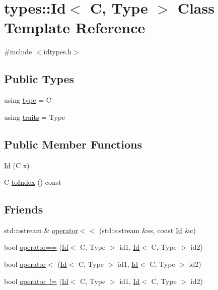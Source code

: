\hypertarget{classtypes_1_1_id}{}\section{types\+::Id$<$ C, Type $>$ Class Template Reference}
\label{classtypes_1_1_id}


{\ttfamily \#include $<$idtypes.\+h$>$}

\subsection*{Public Types}
\begin{DoxyCompactItemize}
\item 
using \mbox{\hyperlink{classtypes_1_1_id_a3460149759853c50fa31ad199e73419a}{type}} = C
\item 
using \mbox{\hyperlink{classtypes_1_1_id_a8682580e9156701f2366091360d85b92}{traits}} = Type
\end{DoxyCompactItemize}
\subsection*{Public Member Functions}
\begin{DoxyCompactItemize}
\item 
\mbox{\hyperlink{classtypes_1_1_id_acd8d5b53062c84735cd77f1b410857d1}{Id}} (C x)
\item 
C \mbox{\hyperlink{classtypes_1_1_id_a8b4a4ba53dfbfda655ece5e6ea9fbcd5}{to\+Index}} () const
\end{DoxyCompactItemize}
\subsection*{Friends}
\begin{DoxyCompactItemize}
\item 
std\+::ostream \& \mbox{\hyperlink{classtypes_1_1_id_ab2773c62c8f10c14d6cca24b2c51b222}{operator$<$$<$}} (std\+::ostream \&ss, const \mbox{\hyperlink{classtypes_1_1_id}{Id}} \&c)
\item 
bool \mbox{\hyperlink{classtypes_1_1_id_a04078fd618a64803321fd0badf4447e2}{operator==}} (\mbox{\hyperlink{classtypes_1_1_id}{Id}}$<$ C, Type $>$ id1, \mbox{\hyperlink{classtypes_1_1_id}{Id}}$<$ C, Type $>$ id2)
\item 
bool \mbox{\hyperlink{classtypes_1_1_id_a1af56b89265288b186667ef10b5803ac}{operator$<$}} (\mbox{\hyperlink{classtypes_1_1_id}{Id}}$<$ C, Type $>$ id1, \mbox{\hyperlink{classtypes_1_1_id}{Id}}$<$ C, Type $>$ id2)
\item 
bool \mbox{\hyperlink{classtypes_1_1_id_a66aa311b2a121325030611f6d46e7f71}{operator !=}} (\mbox{\hyperlink{classtypes_1_1_id}{Id}}$<$ C, Type $>$ id1, \mbox{\hyperlink{classtypes_1_1_id}{Id}}$<$ C, Type $>$ id2)
\end{DoxyCompactItemize}


